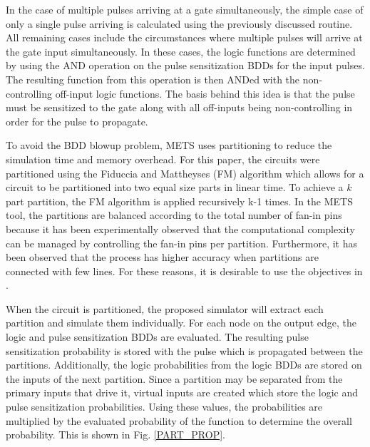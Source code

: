 \documentclass[conference]{IEEEtran}
\newcommand{\squeezeup}{\vspace{-2mm}}
\begin{document}
In the case of multiple pulses arriving at a gate simultaneously, the simple case of only a single pulse arriving is calculated using the previously discussed routine. All remaining cases include the circumstances where multiple pulses will arrive at the gate input simultaneously. In these cases, the logic functions are determined by using the AND operation on the pulse sensitization BDDs for the input pulses. The resulting function from this operation is then ANDed with the non-controlling off-input logic functions. The basis behind this idea is that the pulse must be sensitized to the gate along with all off-inputs being non-controlling in order for the pulse to propagate.

To avoid the BDD blowup problem, METS uses partitioning to reduce the simulation time and memory overhead. For this paper, the circuits were partitioned using the Fiduccia and Mattheyses (FM) algorithm \cite{Fiduccia1982} which allows for a circuit to be partitioned into two equal size parts in linear time. To achieve a $k$ part partition, the FM algorithm is applied recursively k-1 times. In the METS tool, the partitions are balanced according to the total number of fan-in pins because it has been experimentally observed that the computational complexity can be managed by controlling the fan-in pins per partition. Furthermore, it has been observed that the process has higher accuracy when partitions are connected with few lines. For these reasons, it is desirable to use the objectives in \cite{Fiduccia1982}.

When the circuit is partitioned, the proposed simulator will extract each partition and simulate them individually. For each node on the output edge, the logic and pulse sensitization BDDs are evaluated. The resulting pulse sensitization probability is stored with the pulse which is propagated between the partitions. Additionally, the logic probabilities from the logic BDDs are stored on the inputs of the next partition. Since a partition may be separated from the primary inputs that drive it, virtual inputs are created which store the logic and pulse sensitization probabilities. Using these values, the probabilities are multiplied by the evaluated probability of the function to determine the overall probability. This is shown in Fig. \ref{PART_PROP}.

\squeezeup

\setlength{\abovecaptionskip}{-12pt}

\setlength{\belowcaptionskip}{-12pt}
\end{document}
